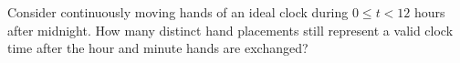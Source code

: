 Consider continuously moving hands of an ideal clock during $0\le t<12$ hours after midnight. How many distinct hand placements still represent a valid clock time after the hour and minute hands are exchanged?
